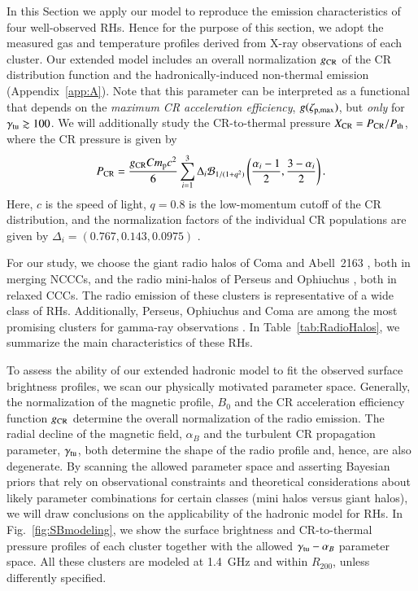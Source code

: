 \documentclass[useAMS,usenatbib]{mn2e}
\begin{document}
In this Section we apply our model to reproduce the emission characteristics of
four well-observed RHs. Hence for the purpose of this section, we adopt the
measured gas and temperature profiles derived from X-ray observations of each cluster.  
Our extended model includes an overall normalization $g_{{\mathrm{CR}}}$ of the CR
distribution function and the hadronically-induced non-thermal emission 
(Appendix~\ref{app:A}). Note that
this parameter can be interpreted as a functional that depends on the
\emph{maximum CR acceleration efficiency}, $g(\zeta_{{\mathrm{p,max}}})$,
\citep{2010MNRAS.409..449P} but \emph{only} for
$\gamma_{{\mathrm{tu}}}\gtrsim100$. We will additionally study the CR-to-thermal
pressure $X_{{\mathrm{CR}}}=P_{{\mathrm{CR}}}/P_{{\mathrm{th}}}$, where the CR pressure is
given by
\begin{equation}
  \label{eq:PCR}
  P_{{\mathrm{CR}}}=\frac{g_{{\mathrm{CR}}} C m_{{\mathrm{p}}} c^{2}}{6}
  \sum_{i=1}^{3} \Delta_{i} \mathcal{B}_{1/(1+q^2)} \left(
    \frac{\alpha_{i}-1}{2},\frac{3-\alpha_{i}}{2} \right).
\end{equation}
Here, $c$ is the speed of light, $q=0.8$ is the low-momentum cutoff of the CR
distribution, and the normalization factors of the individual CR populations are
given by $\Delta_{i} = (0.767, 0.143, 0.0975)$ \citep[][see also
Appendix~\ref{app:A}]{2010MNRAS.409..449P}.

For our study, we choose the giant radio halos of Coma
\citep{1997A&A...321...55D} and Abell~2163 \citep{2001A&A...373..106F,
  2009A&A...499..679M}, both in merging NCCCs, and the radio mini-halos of
Perseus \citep{1990MNRAS.246..477P} and Ophiuchus \citep{2009A&A...499..371G,
  2009A&A...499..679M}, both in relaxed CCCs. The radio emission of these
clusters is representative of a wide class of RHs.  Additionally, Perseus,
Ophiuchus and Coma are among the most promising clusters for gamma-ray
observations \citep{2010MNRAS.409..449P,2011arXiv1105.3240P}. In
Table~\ref{tab:RadioHalos}, we summarize the main characteristics of these RHs.

To assess the ability of our extended hadronic model to fit the observed surface
brightness profiles, we scan our physically motivated parameter
space. Generally, the normalization of the magnetic profile, $B_0$ and the CR
acceleration efficiency function $g_{{\mathrm{CR}}}$ determine the overall
normalization of the radio emission. The radial decline of the magnetic field,
$\alpha_B$ and the turbulent CR propagation parameter, $\gamma_{{\mathrm{tu}}}$, both
determine the shape of the radio profile and, hence, are also degenerate. By
scanning the allowed parameter space and asserting Bayesian priors that rely on
observational constraints and theoretical considerations about likely parameter
combinations for certain classes (mini halos versus giant halos), we will draw
conclusions on the applicability of the hadronic model for RHs.  In
Fig.~\ref{fig:SBmodeling}, we show the surface brightness and CR-to-thermal
pressure profiles of each cluster together with the allowed
$\gamma_{{\mathrm{tu}}}-\alpha_{B}$ parameter space. All these clusters are
modeled at 1.4~GHz and within $R_{200}$, unless differently specified.
\end{document}
